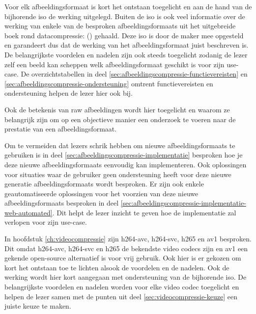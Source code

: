 Voor elk \gls{afbeeldingsformaat} is kort het ontstaan toegelicht en aan de hand van de bijhorende \gls{iso} de werking uitgelegd. Buiten de \gls{iso} is ook veel informatie over de werking van enkele van de besproken \glspl{afbeeldingsformaat} uit het uitgebreide boek rond \gls{datacompressie}:  (\cite{Salomon2006}) gehaald. Deze \gls{iso} is door de maker mee opgesteld en garandeert dus dat de werking van het \gls{afbeeldingsformaat} juist beschreven is. De belangrijkste voordelen en nadelen zijn ook steeds toegelicht zodanig de lezer zelf een beeld kan scheppen welk \gls{afbeeldingsformaat} geschikt is voor zijn \gls{use-case}. De overzichtstabellen in deel \ref{sec:afbeeldingscompressie-functievereisten} en \ref{sec:afbeeldingscompressie-ondersteuning} omtrent functievereisten en ondersteuning helpen de lezer hier ook bij.

Ook de betekenis van \gls{raw} afbeeldingen wordt hier toegelicht en waarom ze belangrijk zijn om op een objectieve manier een onderzoek te voeren naar de prestatie van een \gls{afbeeldingsformaat}.

Om te vermeiden dat lezers schrik hebben om nieuwe \glspl{afbeeldingsformaat} te gebruiken is in deel \ref{sec:afbeeldingscompressie-implementatie} besproken hoe je deze nieuwe \glspl{afbeeldingsformaat} eenvoudig kan implementeren. Ook oplossingen voor situaties waar de gebruiker geen ondersteuning heeft voor deze nieuwe generatie \glspl{afbeeldingsformaat} wordt besproken. Er zijn ook enkele geautomatiseerde oplossingen voor het voorzien van deze nieuwe \glspl{afbeeldingsformaat} besproken in deel \ref{sec:afbeeldingscompressie-implementatie-web-automated}. Dit helpt de lezer inzicht te geven hoe de implementatie zal verlopen voor zijn \gls{use-case}.

In hoofdstuk \ref{ch:videocompressie} zijn \gls{h264-avc}, \gls{h264-svc}, \gls{h265} en \gls{av1} besproken. Dit omdat \gls{h264-avc}, \gls{h264-svc} en \gls{h265} de bekendste video \glspl{codec} zijn en \gls{av1} een gekende \gls{open-source} alternatief is voor vrij gebruik. Ook hier is er gekozen om kort het ontstaan toe te lichten alsook de voordelen en de nadelen. Ook de werking wordt hier kort aangegaan met ondersteuning van de bijhorende \gls{iso}. De belangrijkste voordelen en nadelen worden voor elke video \gls{codec} toegelicht en helpen de lezer samen met de punten uit deel \ref{sec:videocompressie-keuze} een juiste keuze te maken.

